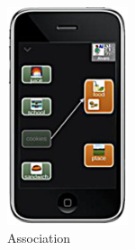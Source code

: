\begin{figure}[!hbt]
    \begin{subfigure}{0.19\textwidth}
        \includegraphics[width=\textwidth]{poten3}
        \caption{Association}
    \end{subfigure}\hspace{0.1\textwidth}
\begin{subfigure}{0.19\textwidth}

\end{subfigure}
\end{figure}
